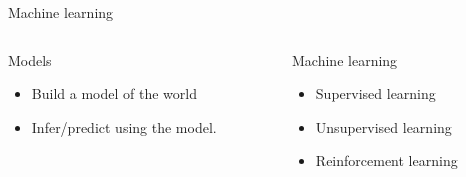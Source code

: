 \begin{frame}[allowframebreaks]{Machine learning}
	\begin{columns}
		\begin{column}{.5\textwidth}
			\begin{block}{Models}
				\begin{itemize}
					\item Build a model of the world  
					\item Infer/predict using the model. 
				\end{itemize}
			\end{block}
		\end{column}
		
		\begin{column}{.5\textwidth}
			\begin{block}{Machine learning}			
				\begin{itemize}
					\item Supervised learning 
					\item Unsupervised learning 
					\item Reinforcement learning 
				\end{itemize}
			\end{block}
		\end{column}
	\end{columns}

\framebreak


\end{frame}
